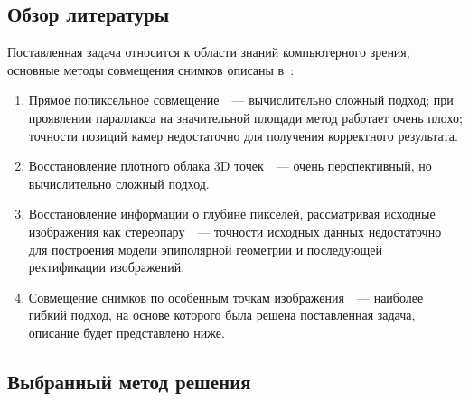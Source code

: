 \documentclass[a4paper,12pt]{article}
\begin{document}
\subsection{Обзор литературы}
Поставленная задача относится к области знаний компьютерного зрения, 
основные методы совмещения снимков описаны 
в~\cite{zitova03is-survey, szelisky06alignstichtut, szelisky10compvis}:
\begin{enumerate}
  \item Прямое попиксельное совмещение~\cite{bergen92hmbme}~--- 
  вычислительно сложный подход; 
  при проявлении параллакса на значительной площади метод работает очень плохо;
  точности позиций камер недостаточно для получения корректного
  результата.
  \item Восстановление плотного облака 3D точек~\cite{furu09mvs}~--- очень перспективный, 
  но вычислительно сложный подход.
  \item Восстановление информации о глубине пикселей, рассматривая исходные
  изображения как стереопару~\cite{scharstein02taxonomy}~--- 
  точности исходных данных недостаточно для построения модели эпиполярной 
  геометрии и последующей ректификации изображений.
  \item Совмещение снимков по особенным точкам изображения~\cite{cham98matchframework, brown03recognising, mclauchlan02mosaic}~--- 
  наиболее гибкий подход, на основе которого была решена поставленная задача, 
  описание будет представлено ниже.
\end{enumerate}



\subsection{Выбранный метод решения}
\end{document}
